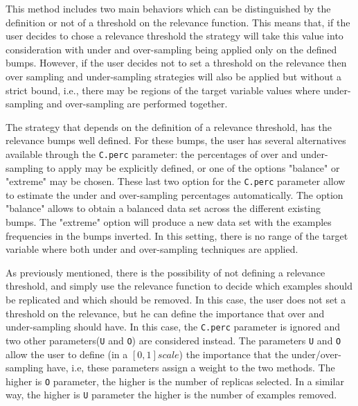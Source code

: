 \documentclass[10pt,a4paper]{article}\usepackage[]{graphicx}\usepackage[]{color}
\begin{document}
This method includes two main behaviors which can be distinguished by the definition or not of a threshold on the relevance function. This means that, if the user decides to chose a relevance threshold the strategy will take this value into consideration with under and over-sampling being applied only on the defined bumps. However, if the user decides not to set a threshold on the relevance then over sampling and under-sampling strategies will also be applied but without a strict bound, i.e., there may be regions of the target variable values where under-sampling and over-sampling are performed together.

The strategy that depends on the definition of a relevance threshold, has the relevance bumps well defined. For these bumps, the user has several alternatives available through the \texttt{C.perc} parameter: the percentages of over and under-sampling to apply may be explicitly defined, or one of the options "balance" or "extreme" may be chosen. These last two option for the \texttt{C.perc} parameter allow to estimate the under and over-sampling percentages automatically. The option "balance" allows to obtain  a balanced data set across the different existing bumps. The "extreme" option will produce a new data set with the examples frequencies in the bumps inverted. In this setting, there is no range of the target variable where both under and over-sampling techniques are applied. 

As previously mentioned, there is the possibility of not defining a relevance threshold, and simply use the relevance function to decide which examples should be replicated and which should be removed. In this case, the user does not set a threshold on the relevance, but he can define the importance that over and under-sampling should have. In this case, the \texttt{C.perc} parameter is ignored and two other parameters(\texttt{U} and \texttt{O}) are considered instead. The parameters \texttt{U} and \texttt{O} allow the user to define (in a $[0,1] scale$) the importance that the under/over-sampling have, i.e, these parameters assign a weight to the two methods. The higher is \texttt{O} parameter, the higher is the number of replicas selected. In a similar way, the higher is \texttt{U} parameter the higher is the number of examples removed.
\end{document}

